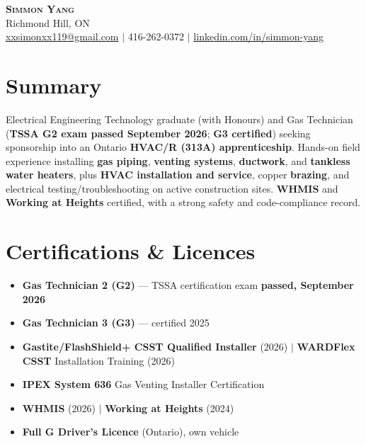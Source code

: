 \documentclass[letterpaper,11pt]{article}
\begin{document}
\begin{center}
    \textbf{\Huge \scshape Simmon Yang} \\ \vspace{1pt}
    Richmond Hill, ON \\
    \href{mailto:xxsimonxx119@gmail.com}{xxsimonxx119@gmail.com} $|$ 416-262-0372 $|$
    \href{https://www.linkedin.com/in/simmon-yang/}{linkedin.com/in/simmon-yang}
\end{center}

\section{Summary}
Electrical Engineering Technology graduate (with Honours) and Gas Technician (\textbf{TSSA G2 exam passed September 2026}; \textbf{G3 certified}) seeking sponsorship into an Ontario \textbf{HVAC/R (313A) apprenticeship}. Hands-on field experience installing \textbf{gas piping}, \textbf{venting systems}, \textbf{ductwork}, and \textbf{tankless water heaters}, plus \textbf{HVAC installation and service}, copper \textbf{brazing}, and electrical testing/troubleshooting on active construction sites. \textbf{WHMIS} and \textbf{Working at Heights} certified, with a strong safety and code-compliance record.

\section{Certifications \& Licences}
\begin{itemize}[leftmargin=0.15in]
  \item \textbf{Gas Technician 2 (G2)} --- TSSA certification exam \textbf{passed, September 2026}
  \item \textbf{Gas Technician 3 (G3)} --- certified 2025
  \item \textbf{Gastite/FlashShield+ CSST Qualified Installer} (2026) $|$ \textbf{WARDFlex CSST} Installation Training (2026)
  \item \textbf{IPEX System 636} Gas Venting Installer Certification
  \item \textbf{WHMIS} (2026) $|$ \textbf{Working at Heights} (2024)
  \item \textbf{Full G Driver's Licence} (Ontario), own vehicle
\end{itemize}

\end{document}
